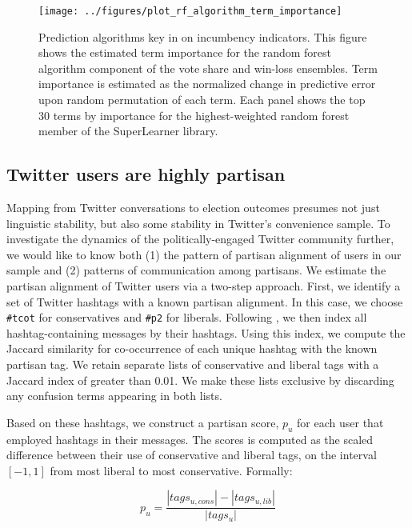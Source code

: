 \documentclass{acm_proc_article-sp}
\begin{document}
\begin{figure}[ht]
  \centering
  \texttt{[image: ../figures/plot\_rf\_algorithm\_term\_importance]}
  \caption{Prediction algorithms key in on incumbency
    indicators. This figure shows the estimated term importance for the random forest algorithm component
    of the vote share and win-loss ensembles. Term importance is
    estimated as the normalized change in predictive error upon
    random permutation of each term. Each panel shows the top
    30 terms by importance for the highest-weighted random forest
    member of the SuperLearner library.}
  \label{fig:rf-term-importance}
\end{figure}

\subsection{Twitter users are highly partisan}
\label{sec:part-cont-twitt}

Mapping from Twitter conversations to election outcomes presumes not
just linguistic stability, but also some stability in Twitter's
convenience sample. To investigate the dynamics of the
politically-engaged Twitter community further, we would like to know
both (1) the pattern of partisan alignment of users in our sample and
(2) patterns of communication among partisans. We estimate the
partisan alignment of Twitter users via a two-step approach. First, we
identify a set of Twitter hashtags with a known partisan alignment. In
this case, we choose \texttt{\#tcot} for conservatives and
\texttt{\#p2} for liberals. Following \cite{conover2011}, we then
index all hashtag-containing messages by their hashtags. Using this
index, we compute the Jaccard similarity for co-occurrence of each
unique hashtag with the known partisan tag. We retain separate lists
of conservative and liberal tags with a Jaccard index of greater than
0.01. We make these lists exclusive by discarding any confusion terms
appearing in both lists.

Based on these hashtags, we construct a partisan score, $p_u$ for each
user that employed hashtags in their messages. The scores is computed
as the scaled difference between their use of conservative and liberal
tags, on the interval $[-1, 1]$ from most liberal to most
conservative. Formally:

 \begin{equation}
   \label{eq:pscore}
   p_u = \frac{\left|tags_{u,cons}\right| - \left|tags_{u, lib}\right|}{\left|tags_u\right|}
 \end{equation}
\end{document}
